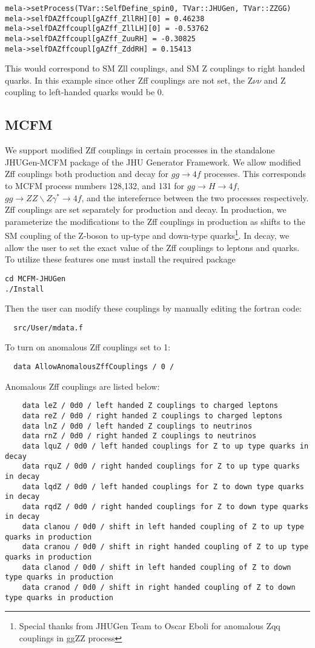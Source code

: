 \documentclass[aps,superscriptaddress,nofootinbib]{revtex4}
\begin{document}
\begin{verbatim}
mela->setProcess(TVar::SelfDefine_spin0, TVar::JHUGen, TVar::ZZGG)
mela->selfDAZffcoupl[gAZff_ZllRH][0] = 0.46238
mela->selfDAZffcoupl[gAZff_ZllLH][0] = -0.53762
mela->selfDAZffcoupl[gAZff_ZuuRH] = -0.30825
mela->selfDAZffcoupl[gAZff_ZddRH] = 0.15413
\end{verbatim}
This would correspond to SM Zll couplings, and SM Z couplings to right handed quarks. In this example since other Zff couplings are not set, the 
Z$\nu\nu$ and Z coupling to left-handed quarks would be 0. 

\subsection{MCFM}
We support modified Zff couplings in certain processes in the standalone JHUGen-MCFM package of the JHU Generator Framework. We allow modified Zff couplings both production and decay for $gg \to 4f$ processes. This corresponds to MCFM 
process numbers 128,132, and 131 for $gg \to H \to 4f$, $gg \to ZZ\backslash Z\gamma^{\ast} \to 4f $, and the interefernce between the two processes respectively. Zff couplings are set separately for production and decay.
In production, we parameterize the modifications to the Zff couplings in production as shifts to the SM coupling of the Z-boson to up-type and down-type quarks\footnote{Special thanks from JHUGen Team to Oscar Eboli for anomalous Zqq couplings in ggZZ process}. In decay, we allow the user to set the exact value of the Zff couplings to leptons and quarks. To utilize these features one must install the required package
\begin{verbatim}
cd MCFM-JHUGen
./Install
\end{verbatim}
Then the user can modify these couplings by manually editing the fortran code:
\begin{verbatim}
  src/User/mdata.f
\end{verbatim}
To turn on anomalous Zff couplings set to 1:
\begin{verbatim}
  data AllowAnomalousZffCouplings / 0 /
\end{verbatim}
Anomalous Zff couplings are listed below:
\begin{verbatim}
    data leZ / 0d0 / left handed Z couplings to charged leptons
    data reZ / 0d0 / right handed Z couplings to charged leptons 
    data lnZ / 0d0 / left handed Z couplings to neutrinos 
    data rnZ / 0d0 / right handed Z couplings to neutrinos
    data lquZ / 0d0 / left handed couplings for Z to up type quarks in decay 
    data rquZ / 0d0 / right handed couplings for Z to up type quarks in decay 
    data lqdZ / 0d0 / left handed couplings for Z to down type quarks in decay
    data rqdZ / 0d0 / right handed couplings for Z to down type quarks in decay
    data clanou / 0d0 / shift in left handed coupling of Z to up type quarks in production  
    data cranou / 0d0 / shift in right handed coupling of Z to up type quarks in production 
    data clanod / 0d0 / shift in left handed coupling of Z to down type quarks in production  
    data cranod / 0d0 / shift in right handed coupling of Z to down type quarks in production  
\end{verbatim}
\end{document}
